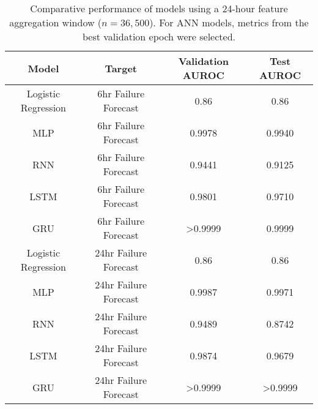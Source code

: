 \documentclass{article}
\begin{document}
\begin{table}[!htbp]
    \centering
    \renewcommand{\arraystretch}{1.1}
    \begin{tabular}{|cccc|}
    \hline
    \rowcolor[HTML]{C0C0C0} 
    \cellcolor[HTML]{C0C0C0}\textbf{Model} & \textbf{Target}       & \textbf{Validation AUROC} & \textbf{Test AUROC} \\ \hline
    Logistic Regression                    & 6hr Failure Forecast  & 0.86                            & 0.86                            \\
    MLP                                    & 6hr Failure Forecast  & 0.9978                            & 0.9940                            \\
    RNN                                    & 6hr Failure Forecast  & 0.9441                            & 0.9125                            \\
    LSTM                                   & 6hr Failure Forecast  & 0.9801                            & 0.9710                            \\
    GRU                                    & 6hr Failure Forecast  & >0.9999                            & 0.9999                            \\
    Logistic Regression                    & 24hr Failure Forecast & 0.86                            & 0.86                            \\
    MLP                                    & 24hr Failure Forecast & 0.9987                            & 0.9971                            \\
    RNN                                    & 24hr Failure Forecast & 0.9489                            & 0.8742                            \\
    LSTM                                   & 24hr Failure Forecast & 0.9874                            & 0.9679                            \\
    GRU                                    & 24hr Failure Forecast & >0.9999                            & >0.9999                            \\ \hline
    \end{tabular}
    \caption{Comparative performance of models using a 24-hour feature aggregation window \newline ($n = 36,500$). For ANN models, metrics from the best validation epoch were selected.}
    \label{tab:table1}
\end{table}
\end{document}
